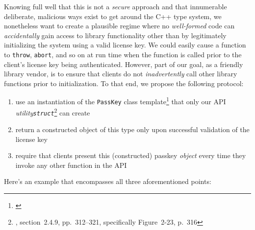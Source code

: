 \noindent Knowing full well that this is not a \emph{secure} approach and that
innumerable deliberate, malicious ways exist to get around the C++ type
system, we nonetheless want to create a plausible regime where no
\emph{well-formed} code can \emph{accidentally} gain access
to library functionality other than by legitimately initializing the
system using a valid license key. We could easily cause a
function to \lstinline!throw!, \lstinline!abort!, and so on at run time when
the function is called prior to the client's license key being
authenticated. However, part of our goal, as a friendly library vendor, is to
ensure that clients do not \emph{inadvertently} call other library
functions prior to initialization. To that end, we propose the following protocol:
\begin{enumerate}
\item{use an instantiation of the \lstinline!PassKey! class template\cprotect\footnote{\cite{mayrand15}} that only our API \emph{utility}\linebreak[4] \emph{\lstinline!struct!}\cprotect\footnote{\cite{lakos20}, section~2.4.9, pp.~312--321, specifically Figure~2-23, p.~316} can create}
\item{return a constructed object of this type only upon successful validation of the license key}
\item{require that clients present this (constructed) passkey \emph{object} every time they invoke any other function in the API}
\end{enumerate}
Here's an example that encompasses all three aforementioned points:

